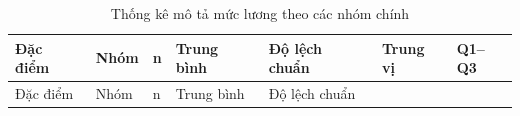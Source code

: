 \begin{landscape}
\small
\begin{longtable}[]{@{}
  >{\raggedright\arraybackslash}p{}
  >{\raggedright\arraybackslash}p{}
  >{\raggedleft\arraybackslash}p{}
  >{\raggedleft\arraybackslash}p{}
  >{\raggedleft\arraybackslash}p{}
  >{\raggedleft\arraybackslash}p{}
  >{\raggedleft\arraybackslash}p{}@{}}
\caption{Thống kê mô tả mức lương theo các nhóm chính}\tabularnewline
\toprule\noalign{}
\begin{minipage}[b]{\linewidth}\raggedright
Đặc điểm
\end{minipage} & \begin{minipage}[b]{\linewidth}\raggedright
Nhóm
\end{minipage} & \begin{minipage}[b]{\linewidth}\raggedleft
n
\end{minipage} & \begin{minipage}[b]{\linewidth}\raggedleft
Trung bình
\end{minipage} & \begin{minipage}[b]{\linewidth}\raggedleft
Độ lệch chuẩn
\end{minipage} & \begin{minipage}[b]{\linewidth}\raggedleft
Trung vị
\end{minipage} & \begin{minipage}[b]{\linewidth}\raggedleft
Q1--Q3
\end{minipage} \\
\midrule\noalign{}
\endfirsthead
\toprule\noalign{}
\begin{minipage}[b]{\linewidth}\raggedright
Đặc điểm
\end{minipage} & \begin{minipage}[b]{\linewidth}\raggedright
Nhóm
\end{minipage} & \begin{minipage}[b]{\linewidth}\raggedleft
n
\end{minipage} & \begin{minipage}[b]{\linewidth}\raggedleft
Trung bình
\end{minipage} & \begin{minipage}[b]{\linewidth}\raggedleft
Độ lệch chuẩn
\end{minipage} & \begin{minipage}[b]{\linewidth}\raggedleft

\end{minipage}
\end{longtable}
\end{landscape}
